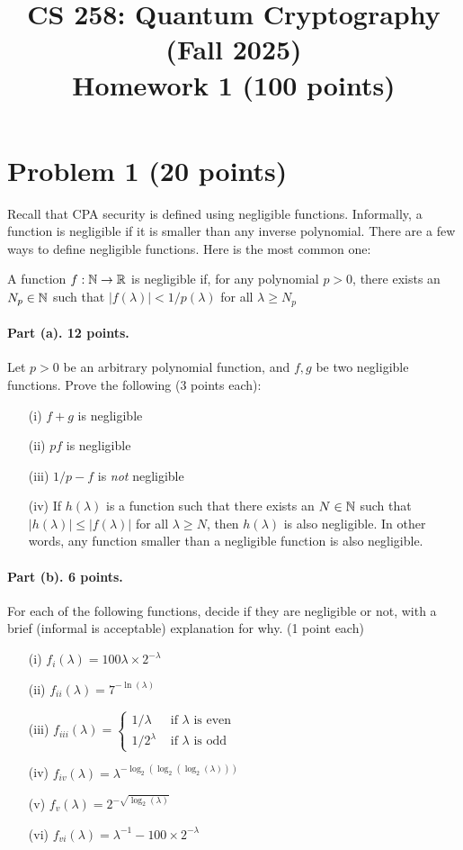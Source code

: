 \documentclass{article}
\title{CS 258: Quantum Cryptography (Fall 2025)\\ Homework 1 (100 points)}
\author{}
\date{}
\begin{document}
\maketitle



\section{Problem 1 (20 points)}

Recall that CPA security is defined using negligible functions. Informally, a function is negligible if it is smaller than any inverse polynomial. There are a few ways to define negligible functions. Here is the most common one:
\begin{definition}\label{def:negl} A function $f:{\mathbb{N}}\rightarrow{\mathbb{R}}$ is negligible if, for any polynomial $p>0$, there exists an $N_p\in{\mathbb{N}}$ such that $|f(\lambda)|<1/p(\lambda)$ for all $\lambda\geq N_p$
\end{definition}

\paragraph{Part (a). 12 points.} Let $p>0$ be an arbitrary polynomial function, and $f,g$ be two negligible functions. Prove the following (3 points each):
\begin{itemize}
    \item[(i)] $f+g$ is negligible
    \item[(ii)] $pf$ is negligible
    \item[(iii)] $1/p-f$ is \emph{not} negligible
    \item[(iv)] If $h(\lambda)$ is a function such that there exists an $N\in{\mathbb{N}}$ such that $|h(\lambda)|\leq |f(\lambda)|$ for all $\lambda\geq N$, then $h(\lambda)$ is also negligible. In other words, any function smaller than a negligible function is also negligible.
\end{itemize}

\paragraph{Part (b). 6 points.} For each of the following functions, decide if they are negligible or not, with a brief (informal is acceptable) explanation for why. (1 point each)
\begin{itemize}
    \item[(i)] $f_i(\lambda)=100\lambda\times 2^{-\lambda}$
    \item[(ii)] $f_{ii}(\lambda)=7^{-\ln(\lambda)}$
    \item[(iii)] $f_{iii}(\lambda)=\begin{cases}1/\lambda&\text{ if $\lambda$ is even}\\1/2^\lambda&\text{ if $\lambda$ is odd}\end{cases}$
    \item[(iv)] $f_{iv}(\lambda)=\lambda^{-\log_2(\log_2(\log_2(\lambda)))}$
    \item[(v)] $f_{v}(\lambda)=2^{-\sqrt{\log_2(\lambda)}}$
    \item[(vi)] $f_{vi}(\lambda)=\lambda^{-1}-100\times 2^{-\lambda}$
\end{itemize}
\end{document}
